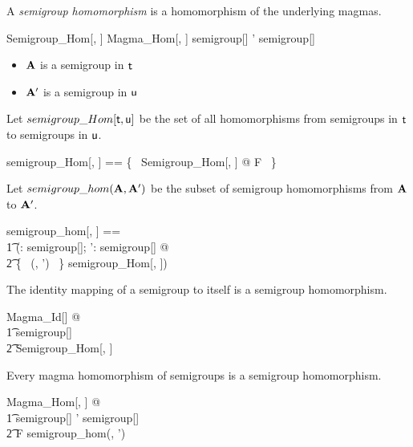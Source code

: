 \documentclass{amsart}
\begin{document}
A \textit{semigroup homomorphism} is a homomorphism of the underlying magmas.

\begin{schema}{Semigroup\_Hom}[\genT, \genU]
	Magma\_Hom[\genT, \genU]
\where
	\strucA \in semigroup[\genT]
\also
	\strucA' \in semigroup[\genU]
\end{schema}

\begin{itemize}
	\item $\mathbf{A}$ is a semigroup in $\mathsf{t}$
	\item $\mathbf{A}'$ is a semigroup in $\mathsf{u}$
\end{itemize}

Let $semigroup\_Hom[\mathsf{t}, \mathsf{u}]$ be the set of all homomorphisms from semigroups in $\mathsf{t}$ to
semigroups in $\mathsf{u}$.

\begin{zed}
	semigroup\_Hom[\genT, \genU] == \{~ Semigroup\_Hom[\genT, \genU] @ F ~\}
\end{zed}

Let $semigroup\_hom(\mathbf{A}, \mathbf{A}')$ be the subset of semigroup homomorphisms from $\mathbf{A}$ to $\mathbf{A}'$.

\begin{zed}
	semigroup\_hom[\genT, \genU] == \\
	\t1	(\lambda \strucA: semigroup[\genT]; \strucA': semigroup[\genU] @ \\
	\t2		\{~ (\strucA, \strucA') ~\} \dres semigroup\_Hom[\genT, \genU])
\end{zed}

\begin{remark}
The identity mapping of a semigroup to itself is a semigroup homomorphism.

\begin{zed}
	\forall Magma\_Id[\setT] @ \\
	\t1	\strucA \in semigroup[\setT] \implies \\
	\t2		Semigroup\_Hom[\setT, \setT]
\end{zed}

\end{remark}

\begin{remark}
Every magma homomorphism of semigroups is a semigroup homomorphism.

\begin{zed}
	\forall Magma\_Hom[\setT, \setU] @ \\
	\t1 \strucA \in semigroup[\setT] \land \strucA' \in semigroup[\setU] \implies \\
	\t2		F \in semigroup\_hom(\strucA, \strucA')
\end{zed}

\end{remark}
\end{document}
